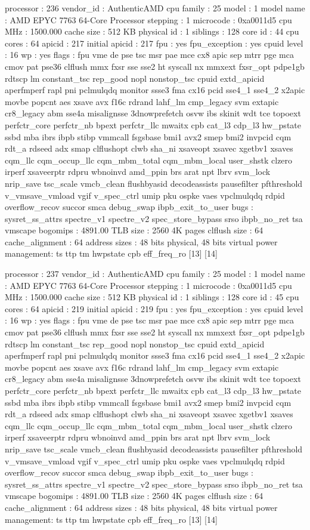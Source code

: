 processor	: 236
vendor_id	: AuthenticAMD
cpu family	: 25
model		: 1
model name	: AMD EPYC 7763 64-Core Processor
stepping	: 1
microcode	: 0xa0011d5
cpu MHz		: 1500.000
cache size	: 512 KB
physical id	: 1
siblings	: 128
core id		: 44
cpu cores	: 64
apicid		: 217
initial apicid	: 217
fpu		: yes
fpu_exception	: yes
cpuid level	: 16
wp		: yes
flags		: fpu vme de pse tsc msr pae mce cx8 apic sep mtrr pge mca cmov pat pse36 clflush mmx fxsr sse sse2 ht syscall nx mmxext fxsr_opt pdpe1gb rdtscp lm constant_tsc rep_good nopl nonstop_tsc cpuid extd_apicid aperfmperf rapl pni pclmulqdq monitor ssse3 fma cx16 pcid sse4_1 sse4_2 x2apic movbe popcnt aes xsave avx f16c rdrand lahf_lm cmp_legacy svm extapic cr8_legacy abm sse4a misalignsse 3dnowprefetch osvw ibs skinit wdt tce topoext perfctr_core perfctr_nb bpext perfctr_llc mwaitx cpb cat_l3 cdp_l3 hw_pstate ssbd mba ibrs ibpb stibp vmmcall fsgsbase bmi1 avx2 smep bmi2 invpcid cqm rdt_a rdseed adx smap clflushopt clwb sha_ni xsaveopt xsavec xgetbv1 xsaves cqm_llc cqm_occup_llc cqm_mbm_total cqm_mbm_local user_shstk clzero irperf xsaveerptr rdpru wbnoinvd amd_ppin brs arat npt lbrv svm_lock nrip_save tsc_scale vmcb_clean flushbyasid decodeassists pausefilter pfthreshold v_vmsave_vmload vgif v_spec_ctrl umip pku ospke vaes vpclmulqdq rdpid overflow_recov succor smca debug_swap ibpb_exit_to_user
bugs		: sysret_ss_attrs spectre_v1 spectre_v2 spec_store_bypass srso ibpb_no_ret tsa vmscape
bogomips	: 4891.00
TLB size	: 2560 4K pages
clflush size	: 64
cache_alignment	: 64
address sizes	: 48 bits physical, 48 bits virtual
power management: ts ttp tm hwpstate cpb eff_freq_ro [13] [14]

processor	: 237
vendor_id	: AuthenticAMD
cpu family	: 25
model		: 1
model name	: AMD EPYC 7763 64-Core Processor
stepping	: 1
microcode	: 0xa0011d5
cpu MHz		: 1500.000
cache size	: 512 KB
physical id	: 1
siblings	: 128
core id		: 45
cpu cores	: 64
apicid		: 219
initial apicid	: 219
fpu		: yes
fpu_exception	: yes
cpuid level	: 16
wp		: yes
flags		: fpu vme de pse tsc msr pae mce cx8 apic sep mtrr pge mca cmov pat pse36 clflush mmx fxsr sse sse2 ht syscall nx mmxext fxsr_opt pdpe1gb rdtscp lm constant_tsc rep_good nopl nonstop_tsc cpuid extd_apicid aperfmperf rapl pni pclmulqdq monitor ssse3 fma cx16 pcid sse4_1 sse4_2 x2apic movbe popcnt aes xsave avx f16c rdrand lahf_lm cmp_legacy svm extapic cr8_legacy abm sse4a misalignsse 3dnowprefetch osvw ibs skinit wdt tce topoext perfctr_core perfctr_nb bpext perfctr_llc mwaitx cpb cat_l3 cdp_l3 hw_pstate ssbd mba ibrs ibpb stibp vmmcall fsgsbase bmi1 avx2 smep bmi2 invpcid cqm rdt_a rdseed adx smap clflushopt clwb sha_ni xsaveopt xsavec xgetbv1 xsaves cqm_llc cqm_occup_llc cqm_mbm_total cqm_mbm_local user_shstk clzero irperf xsaveerptr rdpru wbnoinvd amd_ppin brs arat npt lbrv svm_lock nrip_save tsc_scale vmcb_clean flushbyasid decodeassists pausefilter pfthreshold v_vmsave_vmload vgif v_spec_ctrl umip pku ospke vaes vpclmulqdq rdpid overflow_recov succor smca debug_swap ibpb_exit_to_user
bugs		: sysret_ss_attrs spectre_v1 spectre_v2 spec_store_bypass srso ibpb_no_ret tsa vmscape
bogomips	: 4891.00
TLB size	: 2560 4K pages
clflush size	: 64
cache_alignment	: 64
address sizes	: 48 bits physical, 48 bits virtual
power management: ts ttp tm hwpstate cpb eff_freq_ro [13] [14]

